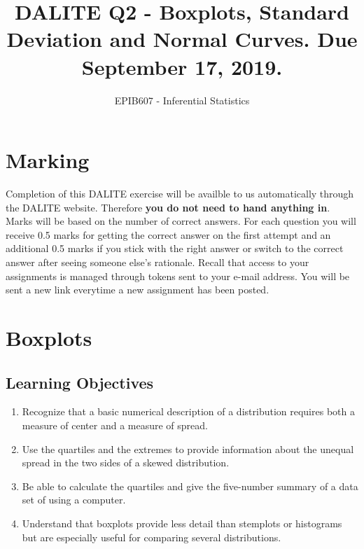 \documentclass[letterpaper,12pt,twoside,printwatermark=false]{pinp}
\title{DALITE Q2 - Boxplots, Standard Deviation and Normal Curves. Due
September 17, 2019.}
\author[a]{EPIB607 - Inferential Statistics}
\affil[a]{Fall 2019, McGill University}
\providecommand{\tightlist}{%
  \setlength{\itemsep}{0pt}\setlength{\parskip}{0pt}}
\begin{document}
\verticaladjustment{-2pt}

\maketitle
\thispagestyle{firststyle}



\hypertarget{marking}{%
\section*{Marking}\label{marking}}

Completion of this DALITE exercise will be availble to us automatically
through the DALITE website. Therefore \textbf{you do not need to hand
anything in}. Marks will be based on the number of correct answers. For
each question you will receive 0.5 marks for getting the correct answer
on the first attempt and an additional 0.5 marks if you stick with the
right answer or switch to the correct answer after seeing someone else's
rationale. Recall that access to your assignments is managed through
tokens sent to your e-mail address. You will be sent a new link
everytime a new assignment has been posted.

\hypertarget{boxplots}{%
\section{Boxplots}\label{boxplots}}

\hypertarget{learning-objectives}{%
\subsection{Learning Objectives}\label{learning-objectives}}

\begin{enumerate}
\def\labelenumi{\arabic{enumi}.}
\tightlist
\item
  Recognize that a basic numerical description of a distribution
  requires both a measure of center and a measure of spread.
\item
  Use the quartiles and the extremes to provide information about the
  unequal spread in the two sides of a skewed distribution.
\item
  Be able to calculate the quartiles and give the five-number summary of
  a data set of using a computer.
\item
  Understand that boxplots provide less detail than stemplots or
  histograms but are especially useful for comparing several
  distributions.
\end{enumerate}
\end{document}
